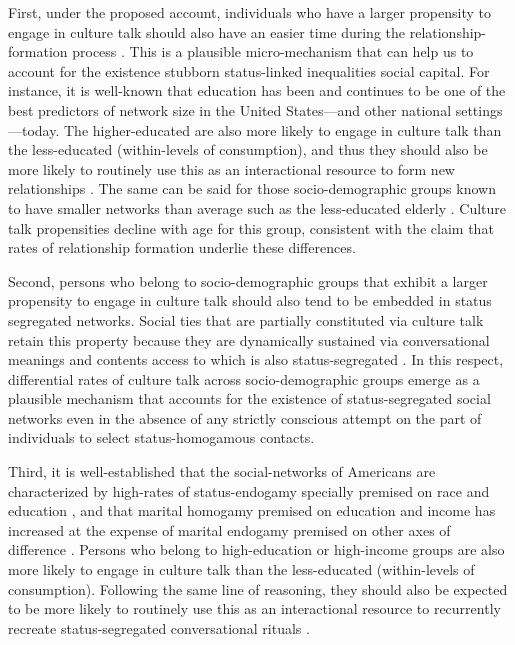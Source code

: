 First, under the proposed account, individuals who have a larger propensity to engage in culture talk should also have an easier time during the relationship-formation process \citep{lazarsfeld_merton54}.  This is a plausible micro-mechanism that can help us to account for the existence stubborn status-linked inequalities social capital.  For instance, it is well-known that education has been \citep{marsden87} and continues to be \citep{lizardo06a, diprete_etal11} one of the best predictors of network size in the United States---and other national settings \citep{mollenhorst_etal11}---today.   The higher-educated are also more likely to engage in culture talk than the less-educated (within-levels of consumption), and thus they should also be more likely to routinely use this as an interactional resource to form new relationships \citep{fine77, dimaggio87}. The same can be said for those socio-demographic groups known to have smaller networks than average such as the less-educated elderly \citep{cornwell_etal08}.  Culture talk propensities decline with age for this group, consistent with the claim that rates of relationship formation underlie these differences.

Second, persons who belong to socio-demographic groups that exhibit a larger propensity to engage in culture talk should also tend to be embedded in status segregated networks.   Social ties that are partially constituted via culture talk retain this property because they are dynamically sustained via conversational meanings and contents access to which is also status-segregated \citep{collins75}.   In this respect, differential rates of culture talk across socio-demographic groups emerge as a plausible mechanism that accounts for the existence of status-segregated social networks even in the absence of any strictly conscious attempt on the part of individuals to select status-homogamous contacts.   

Third, it is well-established that the social-networks of Americans are characterized by high-rates of status-endogamy specially premised on race and education \citep{diprete_etal11}, and that marital homogamy premised on education and income has increased at the expense of marital endogamy premised on other axes of difference \citep{ kalmijn94, schwartz10}.  Persons who belong to high-education or high-income groups are also more likely to engage in culture talk than the less-educated (within-levels of consumption).  Following the same line of reasoning, they should also be expected to be more likely to routinely use this as an interactional resource to recurrently recreate status-segregated conversational rituals \citep{collins04, rivera12, nagel_etal11}.


